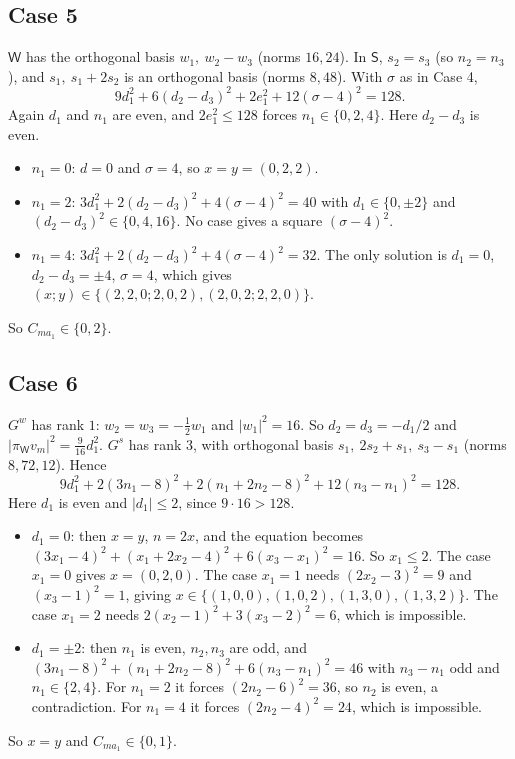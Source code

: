 \documentclass[11pt,a4paper]{amsart}
\theoremstyle{definition}
\theoremstyle{remark}
\begin{document}
\subsection*{Case 5} $\mathsf W$ has the orthogonal basis $w_1,\ w_2-w_3$ (norms $16,24$). In $\mathsf S$,
$s_2=s_3$ (so $n_2=n_3$), and $s_1,\ s_1+2s_2$ is an orthogonal basis (norms $8,48$). With $\sigma$ as in
Case 4,
\[
9d_1^2+6(d_2-d_3)^2+2e_1^2+12(\sigma-4)^2=128 .
\]
Again $d_1$ and $n_1$ are even, and $2e_1^2\le128$ forces $n_1\in\{0,2,4\}$. Here $d_2-d_3$ is even.
\begin{itemize}[leftmargin=2em]
\item $n_1=0$: $d=0$ and $\sigma=4$, so $x=y=(0,2,2)$.
\item $n_1=2$: $3d_1^2+2(d_2-d_3)^2+4(\sigma-4)^2=40$ with $d_1\in\{0,\pm2\}$ and $(d_2-d_3)^2\in\{0,4,16\}$. No
case gives a square $(\sigma-4)^2$.
\item $n_1=4$: $3d_1^2+2(d_2-d_3)^2+4(\sigma-4)^2=32$. The only solution is $d_1=0$, $d_2-d_3=\pm4$,
$\sigma=4$, which gives $(x;y)\in\{(2,2,0;2,0,2),(2,0,2;2,2,0)\}$.
\end{itemize}
So $C_{ma_1}\in\{0,2\}$.

\subsection*{Case 6} $G^w$ has rank $1$: $w_2=w_3=-\frac12w_1$ and $|w_1|^2=16$. So $d_2=d_3=-d_1/2$ and
$|\pi_{\mathsf W}v_m|^2=\frac9{16}d_1^2$. $G^s$ has rank $3$, with orthogonal basis $s_1,\ 2s_2+s_1,\ s_3-s_1$
(norms $8,72,12$). Hence
\[
9d_1^2+2(3n_1-8)^2+2(n_1+2n_2-8)^2+12(n_3-n_1)^2=128 .
\]
Here $d_1$ is even and $|d_1|\le 2$, since $9\cdot16>128$.
\begin{itemize}[leftmargin=2em]
\item $d_1=0$: then $x=y$, $n=2x$, and the equation becomes $(3x_1-4)^2+(x_1+2x_2-4)^2+6(x_3-x_1)^2=16$.
So $x_1\le2$. The case $x_1=0$ gives $x=(0,2,0)$. The case $x_1=1$ needs $(2x_2-3)^2=9$ and $(x_3-1)^2=1$,
giving $x\in\{(1,0,0),(1,0,2),(1,3,0),(1,3,2)\}$. The case $x_1=2$ needs $2(x_2-1)^2+3(x_3-2)^2=6$, which
is impossible.
\item $d_1=\pm2$: then $n_1$ is even, $n_2,n_3$ are odd, and
$(3n_1-8)^2+(n_1+2n_2-8)^2+6(n_3-n_1)^2=46$ with $n_3-n_1$ odd and $n_1\in\{2,4\}$. For $n_1=2$ it forces
$(2n_2-6)^2=36$, so $n_2$ is even, a contradiction. For $n_1=4$ it forces $(2n_2-4)^2=24$, which is
impossible.
\end{itemize}
So $x=y$ and $C_{ma_1}\in\{0,1\}$.
\end{document}
